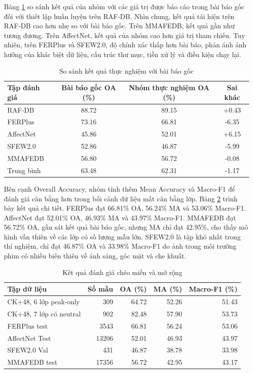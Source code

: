 Bảng \ref{tab:paper_compare} so sánh kết quả của nhóm với các giá trị được báo cáo trong bài báo gốc đối với thiết lập huấn luyện trên RAF-DB. Nhìn chung, kết quả tái hiện trên RAF-DB cao hơn nhẹ so với bài báo gốc. Trên MMAFEDB, kết quả gần như tương đương. Trên AffectNet, kết quả của nhóm cao hơn giá trị tham chiếu. Tuy nhiên, trên FERPlus và SFEW2.0, độ chính xác thấp hơn bài báo, phản ánh ảnh hưởng của khác biệt dữ liệu, cấu trúc thư mục, tiền xử lý và điều kiện chạy lại.

\begin{table}[htbp]
\centering
\caption{So sánh kết quả thực nghiệm với bài báo gốc}
\label{tab:paper_compare}
\begin{tabular}{lccc}
\hline
\textbf{Tập đánh giá} & \textbf{Bài báo gốc OA (\%)} & \textbf{Nhóm thực nghiệm OA (\%)} & \textbf{Sai khác} \\
\hline
RAF-DB & 88.72 & 89.15 & +0.43 \\
FERPlus & 73.16 & 66.81 & -6.35 \\
AffectNet & 45.86 & 52.01 & +6.15 \\
SFEW2.0 & 52.86 & 46.87 & -5.99 \\
MMAFEDB & 56.80 & 56.72 & -0.08 \\
Trung bình & 63.48 & 62.31 & -1.17 \\
\hline
\end{tabular}
\end{table}

Bên cạnh Overall Accuracy, nhóm tính thêm Mean Accuracy và Macro-F1 để đánh giá cân bằng hơn trong bối cảnh dữ liệu mất cân bằng lớp. Bảng \ref{tab:cross_dataset_results} trình bày kết quả chi tiết. FERPlus đạt 66.81\% OA, 56.24\% MA và 53.06\% Macro-F1. AffectNet đạt 52.01\% OA, 46.93\% MA và 43.97\% Macro-F1. MMAFEDB đạt 56.72\% OA, gần sát kết quả bài báo gốc, nhưng MA chỉ đạt 42.95\%, cho thấy mô hình vẫn thiên về các lớp có số lượng mẫu lớn. SFEW2.0 là tập khó nhất trong thí nghiệm, chỉ đạt 46.87\% OA và 33.98\% Macro-F1 do ảnh trong môi trường phim có nhiều biến thiên về ánh sáng, góc mặt và che khuất.

\begin{table}[htbp]
\centering
\caption{Kết quả đánh giá chéo miền và mở rộng}
\label{tab:cross_dataset_results}
\begin{tabular}{lrrrr}
\hline
\textbf{Tập dữ liệu} & \textbf{Số mẫu} & \textbf{OA (\%)} & \textbf{MA (\%)} & \textbf{Macro-F1 (\%)} \\
\hline
CK+48, 6 lớp peak-only & 309 & 64.72 & 52.26 & 51.43 \\
CK+48, 7 lớp có neutral & 902 & 82.48 & 57.90 & 53.73 \\
FERPlus test & 3543 & 66.81 & 56.24 & 53.06 \\
AffectNet Test & 13206 & 52.01 & 46.93 & 43.97 \\
SFEW2.0 Val & 431 & 46.87 & 38.78 & 33.98 \\
MMAFEDB test & 17356 & 56.72 & 42.95 & 43.17 \\
\hline
\end{tabular}
\end{table}

